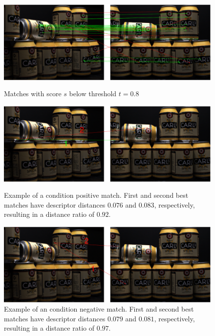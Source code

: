 \documentclass[thesis.tex]{subfiles}
\begin{document}
\begin{figure}[p]
	\centering
	\includegraphics[width=\textwidth]{img/imageCorrespondenceMatches.pdf}
	\caption{Matches with score $s$ below threshold $t = 0.8$}
	\label{fig:imageCorrespondenceMatches}
	\vspace{5mm}
	\includegraphics[width=\textwidth]{img/imageCorrespondenceCorrectMatch.pdf}
	\caption{Example of a condition positive match. First and second best matches have descriptor distances $0.076$ and $0.083$, respectively, resulting in a distance ratio of $0.92$.}
	\label{fig:imageCorrespondenceCorrectMatch}
	\vspace{5mm}
	\includegraphics[width=\textwidth]{img/imageCorrespondenceIncorrectMatch.pdf}
	\caption{Example of an condition negative match. First and second best matches have descriptor distances $0.079$ and $0.081$, respectively, resulting in a distance ratio of $0.97$.}
	\label{fig:imageCorrespondenceIncorrectMatch}
\end{figure}
%
\end{document}
